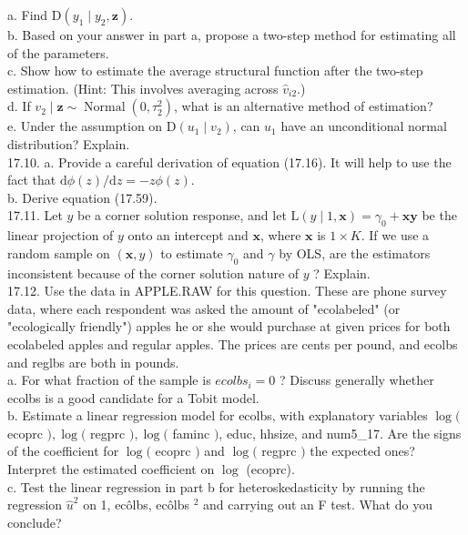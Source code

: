\documentclass[10pt]{article}
\begin{document}
a. Find $\mathrm{D}\left(y_{1} \mid y_{2}, \mathbf{z}\right)$.\\
b. Based on your answer in part a, propose a two-step method for estimating all of the parameters.\\
c. Show how to estimate the average structural function after the two-step estimation. (Hint: This involves averaging across $\hat{v}_{i 2}$.)\\
d. If $v_{2} \mid \mathbf{z} \sim \operatorname{Normal}\left(0, \tau_{2}^{2}\right)$, what is an alternative method of estimation?\\
e. Under the assumption on $\mathrm{D}\left(u_{1} \mid v_{2}\right)$, can $u_{1}$ have an unconditional normal distribution? Explain.\\
17.10. a. Provide a careful derivation of equation (17.16). It will help to use the fact that $\mathrm{d} \phi(z) / \mathrm{d} z=-z \phi(z)$.\\
b. Derive equation (17.59).\\
17.11. Let $y$ be a corner solution response, and let $\mathrm{L}(y \mid 1, \mathbf{x})=\gamma_{0}+\mathbf{x} \boldsymbol{y}$ be the linear projection of $y$ onto an intercept and $\mathbf{x}$, where $\mathbf{x}$ is $1 \times K$. If we use a random sample on $(\mathbf{x}, y)$ to estimate $\gamma_{0}$ and $\gamma$ by OLS, are the estimators inconsistent because of the corner solution nature of $y$ ? Explain.\\
17.12. Use the data in APPLE.RAW for this question. These are phone survey data, where each respondent was asked the amount of "ecolabeled" (or "ecologically friendly") apples he or she would purchase at given prices for both ecolabeled apples and regular apples. The prices are cents per pound, and ecolbs and reglbs are both in pounds.\\
a. For what fraction of the sample is $e c o l b s_{i}=0$ ? Discuss generally whether ecolbs is a good candidate for a Tobit model.\\
b. Estimate a linear regression model for ecolbs, with explanatory variables $\log ($ ecoprc $), \log ($ regprc $), \log ($ faminc $)$, educ, hhsize, and num5\_17. Are the signs of the coefficient for $\log ($ ecoprc $)$ and $\log ($ regprc $)$ the expected ones? Interpret the estimated coefficient on $\log$ (ecoprc).\\
c. Test the linear regression in part b for heteroskedasticity by running the regression $\hat{u}^{2}$ on 1, ecôlbs, ecôlbs ${ }^{2}$ and carrying out an F test. What do you conclude?\\
\end{document}
